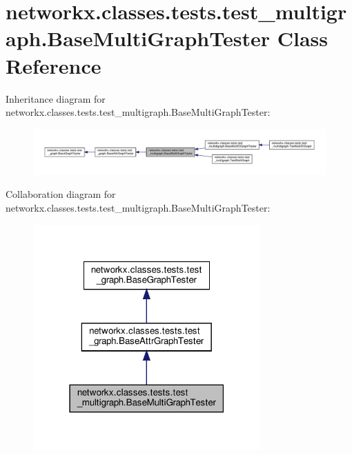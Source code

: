 \hypertarget{classnetworkx_1_1classes_1_1tests_1_1test__multigraph_1_1BaseMultiGraphTester}{}\section{networkx.\+classes.\+tests.\+test\+\_\+multigraph.\+Base\+Multi\+Graph\+Tester Class Reference}
\label{classnetworkx_1_1classes_1_1tests_1_1test__multigraph_1_1BaseMultiGraphTester}


Inheritance diagram for networkx.\+classes.\+tests.\+test\+\_\+multigraph.\+Base\+Multi\+Graph\+Tester\+:
\nopagebreak
\begin{figure}[H]
\begin{center}
\leavevmode
\includegraphics[width=350pt]{classnetworkx_1_1classes_1_1tests_1_1test__multigraph_1_1BaseMultiGraphTester__inherit__graph}
\end{center}
\end{figure}


Collaboration diagram for networkx.\+classes.\+tests.\+test\+\_\+multigraph.\+Base\+Multi\+Graph\+Tester\+:
\nopagebreak
\begin{figure}[H]
\begin{center}
\leavevmode
\includegraphics[width=247pt]{classnetworkx_1_1classes_1_1tests_1_1test__multigraph_1_1BaseMultiGraphTester__coll__graph}
\end{center}
\end{figure}
